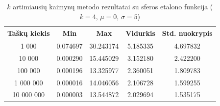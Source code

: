 \begin{table}[H]
    \centering
    \begin{tabular}{|c|c|c|c|c|}
        \hline
        \textbf{Taškų kiekis} & \textbf{Min} & \textbf{Max} & \textbf{Vidurkis} & \textbf{Std. nuokrypis} \\ \hline
        1 000        & 0.074697 & 30.243174 & 5.185335 & 4.697832 \\ \hline
        10 000       & 0.000290 & 15.445029 & 3.152180 & 2.422200 \\ \hline
        100 000      & 0.000196 & 13.325977 & 2.360051 & 1.809783 \\ \hline
        1 000 000    & 0.000016 & 14.046056 & 2.106728 & 1.599255 \\ \hline
        10 000 000   & 0.000003 & 13.544872 & 2.029694 & 1.535175 \\ \hline
    \end{tabular}
    \caption{$k$ artimiausių kaimynų metodo rezultatai su sferos etalono funkcija ($k = 4$, $\mu = 0$, $\sigma = 5$)}
\end{table}